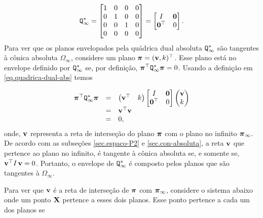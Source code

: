 \begin{equation}\label{eq.quadrica-dual-abs}
{\tt Q}^*_\infty=
\begin{bmatrix}
1&0&0&0\\
0&1&0&0\\
0&0&1&0\\
0&0&0&0
\end{bmatrix}=
\begin{bmatrix}
I&{\bf 0}\\
{\bf 0}^\top&0
\end{bmatrix}.
\end{equation}
Para ver que os planos envelopados pela quádrica dual absoluta ${\tt Q}^*_\infty$ são tangentes à cônica absoluta $\Omega_\infty$, considere um plano $\boldsymbol{\pi}=({\bf v}, k)^\top$. Esse plano está no envelope definido por ${\tt Q}^*_\infty$ se, por definição, $\boldsymbol{\pi}^\top {\tt Q}^*_\infty\boldsymbol{\pi}=0$. Usando a definição em \ref{eq.quadrica-dual-abs} temos

\begin{equation*}
\begin{array}{rcl}
\boldsymbol{\pi}^\top {\tt Q}^*_\infty\boldsymbol{\pi}&=&
\begin{pmatrix}
{\bf v}^\top&k
\end{pmatrix}
\begin{bmatrix}
I&{\bf 0}\\
{\bf 0}^\top&0
\end{bmatrix}
\begin{pmatrix}
{\bf v}\\
k
\end{pmatrix}\\
&=&{\bf v}^\top {\bf v}\\
&=&0,
\end{array}
\end{equation*}
onde, ${\bf v}$ representa a reta de interseção do plano $\boldsymbol{\pi}$ com o plano no infinito $\boldsymbol{\pi}_\infty$. De acordo com as subseções \ref{sec.espaco-P2} e \ref{sec.con-absoluta}, a reta ${\bf v}$ que pertence ao plano no infinito, é tangente à cônica absoluta se, e somente se, ${\bf v}^\top I\,{\bf v}=0$. Portanto, o envelope de ${\tt Q}^*_\infty$ é composto pelos planos que são tangentes à $\Omega_\infty$. 

Para ver que ${\bf v}$ é a reta de interseção de $\boldsymbol{\pi}$ com $\boldsymbol{\pi}_\infty$, considere o sistema abaixo onde um ponto $\mathbf{X}$ pertence a esses dois planos. Esse ponto pertence a cada um dos planos se


